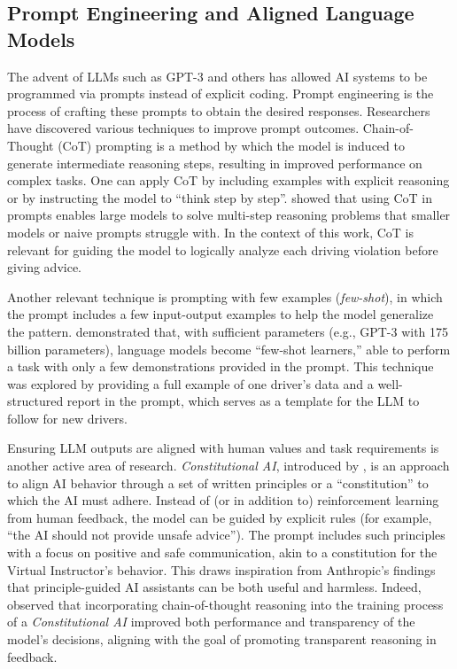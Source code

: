 \documentclass[12pt]{article}
\begin{document}
\subsection{Prompt Engineering and Aligned Language Models}

The advent of LLMs such as GPT-3 and others has allowed AI systems to be programmed via prompts instead of explicit coding. Prompt engineering is the process of crafting these prompts to obtain the desired responses. Researchers have discovered various techniques to improve prompt outcomes. Chain-of-Thought (CoT) prompting is a method by which the model is induced to generate intermediate reasoning steps, resulting in improved performance on complex tasks. One can apply CoT by including examples with explicit reasoning or by instructing the model to “think step by step”. \cite{wei2022} showed that using CoT in prompts enables large models to solve multi-step reasoning problems that smaller models or naive prompts struggle with. In the context of this work, CoT is relevant for guiding the model to logically analyze each driving violation before giving advice.

Another relevant technique is prompting with few examples (\textit{few-shot}), in which the prompt includes a few input-output examples to help the model generalize the pattern. \cite{brown2020} demonstrated that, with sufficient parameters (e.g., GPT-3 with 175 billion parameters), language models become “few-shot learners,” able to perform a task with only a few demonstrations provided in the prompt. This technique was explored by providing a full example of one driver’s data and a well-structured report in the prompt, which serves as a template for the LLM to follow for new drivers.

Ensuring LLM outputs are aligned with human values and task requirements is another active area of research. \textit{Constitutional AI}, introduced by \cite{anthropic2022}, is an approach to align AI behavior through a set of written principles or a “constitution” to which the AI must adhere. Instead of (or in addition to) reinforcement learning from human feedback, the model can be guided by explicit rules (for example, “the AI should not provide unsafe advice”). The prompt includes such principles with a focus on positive and safe communication, akin to a constitution for the Virtual Instructor’s behavior. This draws inspiration from Anthropic’s findings that principle-guided AI assistants can be both useful and harmless. Indeed, \cite{bai2022} observed that incorporating chain-of-thought reasoning into the training process of a \textit{Constitutional AI} improved both performance and transparency of the model’s decisions, aligning with the goal of promoting transparent reasoning in feedback.
\end{document}
